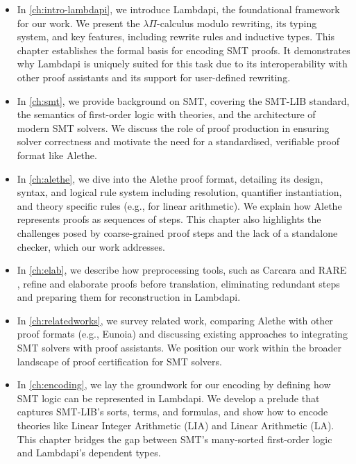 \begin{itemize}
\item In \cref{ch:intro-lambdapi}, we introduce Lambdapi, the foundational framework for our work.
    We present the $\lambda\Pi$-calculus modulo rewriting, its typing system, and key features, including rewrite rules and inductive types.
    This chapter establishes the formal basis for encoding SMT proofs.
    It demonstrates why Lambdapi is uniquely suited for this task due to its interoperability with other proof assistants and its support for user-defined rewriting.

\item In \cref{ch:smt}, we provide background on SMT, covering the SMT-LIB standard, the semantics of first-order logic with theories, and the architecture of modern SMT solvers.
We discuss the role of proof production in ensuring solver correctness and motivate the need for a standardised, verifiable proof format like Alethe.

\item In \cref{ch:alethe}, we dive into the Alethe proof format, detailing its design, syntax, and logical rule system including resolution, quantifier instantiation, and theory specific rules (e.g., for linear arithmetic).
We explain how Alethe represents proofs as sequences of steps.
This chapter also highlights the challenges posed by coarse-grained proof steps and the lack of a standalone checker, which our work addresses.

\item In \cref{ch:elab}, we describe how preprocessing tools, such as Carcara \cite{carcara} and RARE \cite{rare}, refine and elaborate proofs before translation, eliminating redundant steps and preparing them for reconstruction in Lambdapi.

\item In \cref{ch:relatedworks}, we survey related work, comparing Alethe with other proof formats (e.g., Eunoia) and discussing existing approaches to integrating SMT solvers with proof assistants.
    We position our work within the broader landscape of proof certification for SMT solvers.

\item In \cref{ch:encoding}, we lay the groundwork for our encoding by defining how SMT logic can be represented in Lambdapi.
    We develop a prelude that captures SMT-LIB's sorts, terms, and formulas, and show how to encode theories like Linear Integer Arithmetic (LIA) and Linear Arithmetic (LA).
    This chapter bridges the gap between SMT's many-sorted first-order logic and Lambdapi's dependent types.


\end{itemize}

